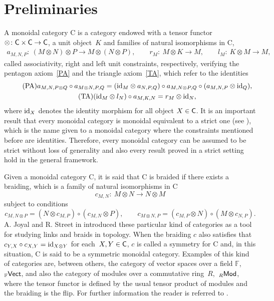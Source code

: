 \documentclass[10pt,a4paper]{amsart}
\numberwithin{equation}{section}
\newcommand{\ot}{\otimes}
\newcommand{\co}{\circ}
\begin{document}
\section{Preliminaries}
A monoidal category {\sf C} is a category endowed with a tensor functor $\otimes\colon {\sf C}\times{\sf C}\rightarrow {\sf C}$, a unit object~$K$ and families of natural isomorphisms in {\sf C},
\begin{gather*}
a_{M,N,P}\colon \ (M\ot N)\ot P\rightarrow M\ot (N\ot P),\qquad r_{M}\colon \ M\ot K\rightarrow M, \qquad l_{M}\colon \ K\ot M\rightarrow M,
\end{gather*}
called associativity, right and left unit constraints, respectively, verifying the pentagon axiom~\eqref{PA} and the triangle axiom~\eqref{TA}, which refer to the identities
\begin{gather}\label{PA}\tag{PA}
a_{M,N, P\ot Q}\co a_{M\ot N,P,Q}= ({\rm id}_{M}\ot a_{N,P,Q})\co a_{M,N\ot P,Q}\co (a_{M,N,P}\ot {\rm id}_{Q}),\\
\label{TA}\tag{TA}
({\rm id}_{M}\ot l_{N})\co a_{M,K,N}=r_{M}\ot {\rm id}_{N},
\end{gather} where ${\rm id}_{X}$ denotes the identity morphism for all object $X\in {\sf C}$. It is an important result that every monoidal category is monoidal equivalent to a strict one (see \cite[Proposition XI.5.1]{K}), which is the name given to a monoidal category where the constraints mentioned before are identities. Therefore, every monoidal category can be assumed to be strict without loss of generality and also every result proved in a strict setting hold in the general framework.

Given a monoidal category {\sf C}, it is said that {\sf C} is braided if there exists a braiding, which is a family of natural isomorphisms in {\sf C}
\[
c_{M,N}\colon \ M\ot N\rightarrow N\ot M
\]
subject to conditions
\[
c_{M,N\ot P}= (N\ot c_{M,P})\co (c_{M,N}\ot P),\qquad
c_{M\ot N, P}= (c_{M,P}\ot N)\co (M\ot c_{N,P}).
\] A. Joyal and R. Street in \cite{JS2} introduced these particular kind of categories as a tool for studying links and braids in topology. When the braiding $c$ also satisfies that $c_{Y,X}\circ c_{X,Y}={\rm id}_{X\otimes Y}$ for each~$X,Y\in {\sf C}$, $c$ is called a symmetry for {\sf C} and, in this situation, {\sf C} is said to be a symmetric monoidal category. Examples of this kind of categories are, between others, the category of vector spaces over a field $\mathbb{F}$, ${}_{\mathbb{F}}{\sf Vect}$, and also the category of modules over a commutative ring~$R$,~${}_{R}{\sf Mod}$, where the tensor functor is defined by the usual tensor product of modules and the braiding is the flip. For further information the reader is referred to \cite{Mac}.
\end{document}

